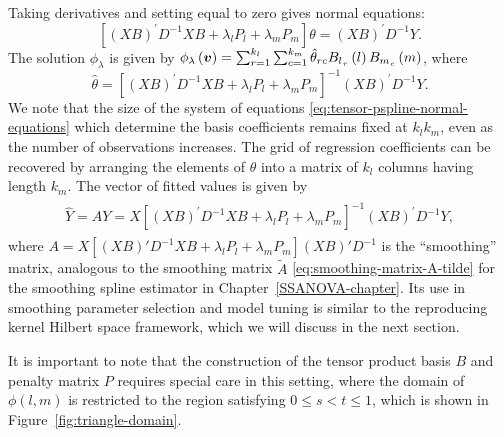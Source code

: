 \noindent
Taking derivatives and setting equal to zero gives normal equations:
\begin{equation} \label{eq:tensor-pspline-normal-equations}
\left[ \left(XB\right)^\prime D^{-1} XB +  \lambda_l P_l+ \lambda_m P_m\right]\theta = \left(X B\right)^\prime D^{-1}Y.
\end{equation}
\noindent
The solution $\phi_\lambda$ is given by $\phi_\lambda\left(\mbox{\boldmath $v$}\right) = \sum_{r=1}^{k_l} \sum_{c=1}^{k_m} \hat{\theta}_{rc} {B_l}_{_{r}}\left(l\right){B_m}_{_{c}}\left(m\right)$, where
\begin{equation} 
\hat{\theta} = \left[ \left(XB\right)^\prime D^{-1} XB +  \lambda_l P_l+ \lambda_m P_m\right]^{-1} \left(X B\right)^\prime D^{-1}Y.
\end{equation}
\noindent
We note that the size of the system of equations \eqref{eq:tensor-pspline-normal-equations} which determine the basis coefficients remains fixed at $k_l k_m$, even as the number of observations increases. The grid of regression coefficients can be recovered by arranging the elements of $\hat{\theta}$ into a matrix of $k_l$ columns having length $k_m$. The vector of fitted values is given by 
\begin{align}
\begin{split} \label{eq:pspline-smoothing-matrix}
\hat{Y} = AY  = X \left[ \left(XB\right)^\prime D^{-1} XB +  \lambda_l P_l+ \lambda_m P_m\right]^{-1} \left(X B\right)^\prime D^{-1}Y,
\end{split}
\end{align}
\noindent
where $A = X \left[ \left(XB\right)' D^{-1} XB +  \lambda_l P_l+ \lambda_m P_m\right] \left(X B\right)' D^{-1}$ is the ``smoothing'' matrix, analogous to the smoothing matrix $\tilde{A}$ \eqref{eq:smoothing-matrix-A-tilde} for the smoothing spline estimator in Chapter~\ref{SSANOVA-chapter}. Its use in smoothing parameter selection and model tuning is similar to the reproducing kernel Hilbert space framework, which we will discuss in the next section.

\bigskip

It is important to note that the construction of the tensor product basis $B$ and penalty matrix $P$ requires special care in this setting, where the domain of ${\phi}\left(l,m\right)$ is restricted to the region satisfying $0 \le s < t \le 1$, which is shown in Figure~\ref{fig:triangle-domain}.

